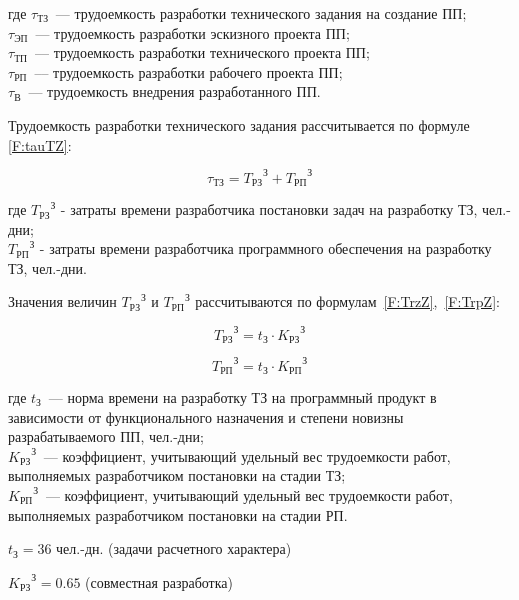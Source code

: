 где $\tau_{\text{ТЗ}}$~--- трудоемкость разработки технического задания на создание ПП; \\ $\tau_{\text{ЭП}}$~--- трудоемкость разработки эскизного проекта ПП; \\ $\tau_{\text{ТП}}$~--– трудоемкость разработки технического проекта ПП; \\ $\tau_{\text{РП}}$~--– трудоемкость разработки рабочего проекта ПП; \\ $\tau_{\text{В}}$~--- трудоемкость внедрения разработанного ПП.

Трудоемкость разработки технического задания рассчитывается по формуле \ref{F:tauTZ}:

\begin{equation}
\tau_{\text{ТЗ}} = {T_{\text{РЗ}}}^\text{З} + {T_{\text{РП}}}^\text{З}
\label{F:tauTZ}
\end{equation}

где ${T_{\text{РЗ}}}^\text{З}$ - затраты времени разработчика постановки задач на разработку ТЗ, чел.-дни; \\ ${T_{\text{РП}}}^\text{З}$ - затраты времени разработчика программного обеспечения на разработку ТЗ, чел.-дни.

Значения величин ${T_{\text{РЗ}}}^\text{З}$ и ${T_{\text{РП}}}^\text{З}$ рассчитываются по формулам~\ref{F:TrzZ},~\ref{F:TrpZ}:

\begin{equation}
{T_{\text{РЗ}}}^\text{З} = t_\text{З} \cdot {K_{\text{РЗ}}}^\text{З}
\label{F:TrzZ}
\end{equation}

\begin{equation}
{T_{\text{РП}}}^\text{З} = t_\text{З} \cdot {K_{\text{РП}}}^\text{З}
\label{F:TrpZ}
\end{equation}

где $t_\text{З}$~--- норма времени на разработку ТЗ на программный продукт в зависимости от функционального назначения и степени новизны разрабатываемого ПП, чел.-дни; \\ ${K_{\text{РЗ}}}^\text{З}$~--- коэффициент, учитывающий удельный вес трудоемкости работ, выполняемых разработчиком постановки на стадии ТЗ; \\ ${K_{\text{РП}}}^\text{З}$~--- коэффициент, учитывающий удельный вес трудоемкости работ, выполняемых разработчиком постановки на стадии РП.

$t_{\text{З}} = 36$ чел.-дн. (задачи расчетного характера)

${K_{\text{РЗ}}}^\text{З} = 0.65$ (совместная разработка)

